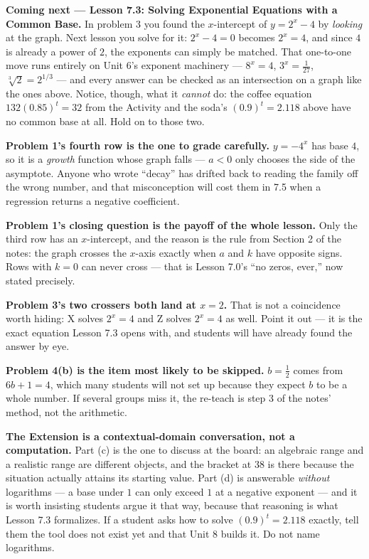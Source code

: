 \documentclass[10pt]{article}
\begin{document}
\begin{spiralbox}
\textbf{Coming next --- Lesson 7.3: Solving Exponential Equations with a Common Base.} In problem 3
you found the $x$-intercept of $y=2^{x}-4$ by \emph{looking} at the graph. Next lesson you solve for
it: $2^{x}-4=0$ becomes $2^{x}=4$, and since $4$ is already a power of $2$, the exponents can simply
be matched. That one-to-one move runs entirely on Unit 6's exponent machinery --- $8^{x}=4$,
$3^{x}=\frac{1}{27}$, $\sqrt[3]{2}=2^{1/3}$ --- and every answer can be checked as an intersection on
a graph like the ones above. Notice, though, what it \emph{cannot} do: the coffee equation
$132(0.85)^{t}=32$ from the Activity and the soda's $(0.9)^{t}=2.118$ above have no common base at
all. Hold on to those two.
\end{spiralbox}

\begin{teachernote}
\textbf{Problem 1's fourth row is the one to grade carefully.} $y=-4^{x}$ has base $4$, so it is a
\emph{growth} function whose graph falls --- $a<0$ only chooses the side of the asymptote. Anyone who
wrote ``decay'' has drifted back to reading the family off the wrong number, and that misconception
will cost them in 7.5 when a regression returns a negative coefficient.

\textbf{Problem 1's closing question is the payoff of the whole lesson.} Only the third row has an
$x$-intercept, and the reason is the rule from Section 2 of the notes: the graph crosses the $x$-axis
exactly when $a$ and $k$ have opposite signs. Rows with $k=0$ can never cross --- that is Lesson 7.0's
``no zeros, ever,'' now stated precisely.

\textbf{Problem 3's two crossers both land at $x=2$.} That is not a coincidence worth hiding: X solves
$2^{x}=4$ and Z solves $2^{x}=4$ as well. Point it out --- it is the exact equation Lesson 7.3 opens
with, and students will have already found the answer by eye.

\textbf{Problem 4(b) is the item most likely to be skipped.} $b=\frac12$ comes from
$6b+1=4$, which many students will not set up because they expect $b$ to be a whole number. If several
groups miss it, the re-teach is step 3 of the notes' method, not the arithmetic.

\textbf{The Extension is a contextual-domain conversation, not a computation.} Part (c) is the one to
discuss at the board: an algebraic range and a realistic range are different objects, and the bracket
at $38$ is there because the situation actually attains its starting value. Part (d) is answerable
\emph{without} logarithms --- a base under $1$ can only exceed $1$ at a negative exponent --- and it is
worth insisting students argue it that way, because that reasoning is what Lesson 7.3 formalizes. If a
student asks how to solve $(0.9)^{t}=2.118$ exactly, tell them the tool does not exist yet and that
Unit 8 builds it. Do not name logarithms.
\end{teachernote}
\end{document}
